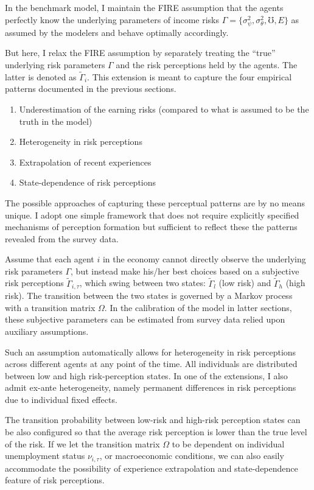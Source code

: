 In the benchmark model, I maintain the FIRE assumption that the agents perfectly know the underlying parameters of income risks $\Gamma =\{\sigma^2_\psi,\sigma^2_\theta,\mho,E\}$ as assumed by the modelers and behave optimally accordingly. 

But here, I relax the FIRE assumption by separately treating the ``true'' underlying risk parameters $\Gamma$ and the risk perceptions held by the agents. The latter is denoted as $\tilde \Gamma_i$. This extension is meant to capture the four empirical patterns documented in the previous sections. 

\begin{enumerate}
    \item Underestimation of the earning risks (compared to what is assumed to be the truth in the model) 
    \item Heterogeneity in risk perceptions 
    \item Extrapolation of recent experiences
    \item State-dependence of risk perceptions 
\end{enumerate}

The possible approaches of capturing these perceptual patterns are by no means unique. I adopt one simple framework that does not require explicitly specified mechanisms of perception formation but sufficient to reflect these the patterns revealed from the survey data.

Assume that each agent $i$ in the economy cannot directly observe the underlying risk parameters $\Gamma$, but instead make his/her best choices based on a subjective risk perceptions  $\tilde \Gamma_{i,\tau}$, which swing between two states: $\tilde \Gamma_l$ (low risk) and $\tilde \Gamma_h$ (high risk). The transition between the two states is governed by a Markov process with a transition matrix $\Omega$. In the calibration of the model in latter sections, these subjective parameters can be estimated from survey data relied upon auxiliary assumptions. 

Such an assumption automatically allows for heterogeneity in risk perceptions across different agents at any point of the time. All individuals are distributed between low and high risk-perception states. In one of the extensions, I also admit ex-ante heterogeneity, namely permanent differences in risk perceptions due to individual fixed effects.  

The transition probability between low-risk and high-risk perception states can be also configured so that the average risk perception is lower than the true level of the risk. If we let the transition matrix $\Omega$ to be dependent on individual unemployment status $\nu_{i,\tau}$, or macroeconomic conditions, we can also easily accommodate the possibility of experience extrapolation and state-dependence feature of risk perceptions. 

